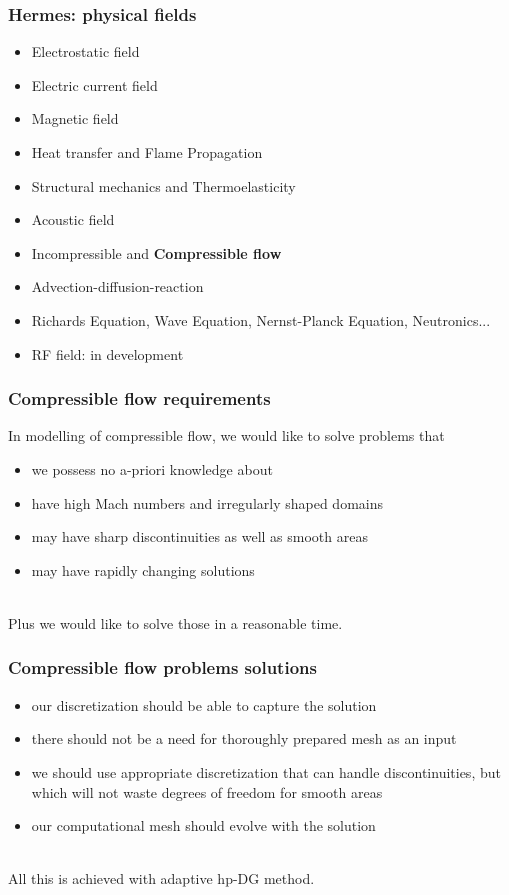 \documentclass{beamer}
\begin{document}
\begin{frame}
\frametitle{Hermes: physical fields}
\begin{itemize}
      \item    Electrostatic field
      \item    Electric current field
      \item    Magnetic field
      \item    Heat transfer and Flame Propagation
      \item    Structural mechanics and Thermoelasticity
      \item    Acoustic field
      \item    Incompressible and \textbf{Compressible flow}
      \item    Advection-diffusion-reaction
      \item    Richards Equation, Wave Equation, Nernst-Planck Equation, Neutronics...
      \item    RF field: in development
\end{itemize}
\end{frame}

\begin{frame}
\large
\frametitle{Compressible flow requirements}
In modelling of compressible flow, we would like to solve problems that\\
\begin{itemize}
\item we possess no a-priori knowledge about
\item have high Mach numbers and irregularly shaped domains
\item may have sharp discontinuities as well as smooth areas
\item may have rapidly changing solutions
\end{itemize}\ \\
Plus we would like to solve those in a reasonable time.
\end{frame}

\begin{frame}
\large
\frametitle{Compressible flow problems solutions}
\begin{itemize}
\item our discretization should be able to capture the solution
\item there should not be a need for thoroughly prepared mesh as an input
\item we should use appropriate discretization that can handle discontinuities, but which will not waste degrees of freedom for smooth areas
\item our computational mesh should evolve with the solution
\end{itemize}\ \\
All this is achieved with adaptive hp-DG method.
\end{frame}
\end{document}
